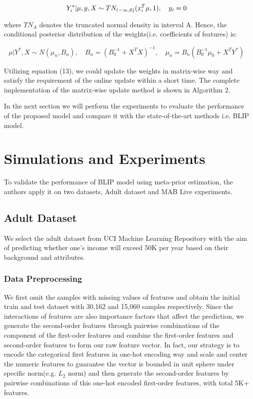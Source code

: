 \documentclass{article}
\begin{document}
\begin{equation}
  Y_i^* | \mu,y,X \sim TN_{(-\infty,0)} (x_i^T \mu,1), \quad y_i = 0 \\ 
\end{equation}

where $TN_A$ denotes the truncated normal density in interval A. Hence, the conditional posterior distribution of the weights(i.e. coefficients of features) is:

\begin{equation}
  \mu|Y^*,X \sim N(\mu_n,B_n), \quad B_n = (B_0^{-1} + X^T X)^{-1}, \quad \mu_n = B_n (B_0^{-1} \mu_0 + X^T Y^*)
\end{equation}

Utilizing equation (13), we could update the weights in matrix-wise way and satisfy the requirement of the online update within a short time. The complete implementation of the matrix-wise update method is shown in Algorithm 2.

In the next section we will perform the experiments to evaluate the performance of the proposed model and compare it with the state-of-the-art methods i.e. BLIP model.

\section{Simulations and Experiments}

To validate the performance of BLIP model using meta-prior estimation, the authors apply it on two datasets, Adult dataset and MAB Live experiments.

\subsection{Adult Dataset}

We select the adult dataset from UCI Machine Learning Repository with the aim of predicting whether one's income will exceed 50K per year based on their background and attributes. 

\subsubsection{Data Preprocessing}

We first omit the samples with missing values of features and obtain the initial train and test dataset with 30,162 and 15,060 samples respectively. Since the interactions of features are also importance factors that affect the prediction, we generate the second-order features through pairwise combinations of the component of the first-oder features and combine the first-order features and second-order features to form our raw feature vector. In fact, our strategy is to encode the categorical first features in one-hot encoding way and scale and center the numeric features to guarantee the vector is bounded in unit sphere under specific norm(e.g. $L_2$ norm) and then generate the second-order features by pairwise combinations of this one-hot encoded first-order features, with total 5K+ features.
\end{document}
